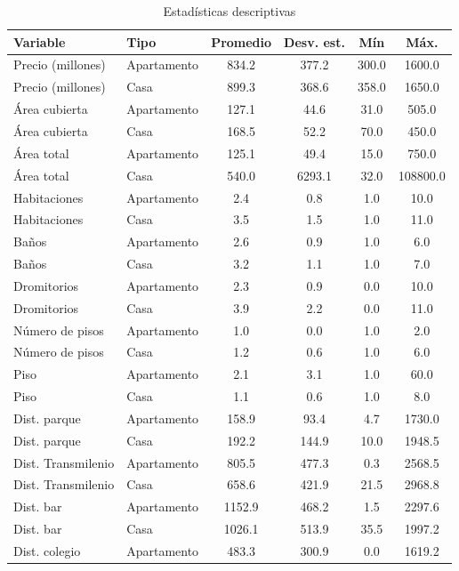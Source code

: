 \documentclass[
  11pt,
  letterpaper,
]{article}
\begin{document}
\begin{table}[!h]
\centering
\caption{\label{tab:descriptive-tbl}Estadísticas descriptivas}
\centering
\begin{tabular}[t]{l|l|c|c|c|c}
\hline
Variable & Tipo & Promedio & Desv. est. & Mín & Máx.\\
\hline
Precio (millones) & Apartamento & 834.2 & 377.2 & 300.0 & 1600.0\\
\hline
Precio (millones) & Casa & 899.3 & 368.6 & 358.0 & 1650.0\\
\hline
Área cubierta & Apartamento & 127.1 & 44.6 & 31.0 & 505.0\\
\hline
Área cubierta & Casa & 168.5 & 52.2 & 70.0 & 450.0\\
\hline
Área total & Apartamento & 125.1 & 49.4 & 15.0 & 750.0\\
\hline
Área total & Casa & 540.0 & 6293.1 & 32.0 & 108800.0\\
\hline
Habitaciones & Apartamento & 2.4 & 0.8 & 1.0 & 10.0\\
\hline
Habitaciones & Casa & 3.5 & 1.5 & 1.0 & 11.0\\
\hline
Baños & Apartamento & 2.6 & 0.9 & 1.0 & 6.0\\
\hline
Baños & Casa & 3.2 & 1.1 & 1.0 & 7.0\\
\hline
Dromitorios & Apartamento & 2.3 & 0.9 & 0.0 & 10.0\\
\hline
Dromitorios & Casa & 3.9 & 2.2 & 0.0 & 11.0\\
\hline
Número de pisos & Apartamento & 1.0 & 0.0 & 1.0 & 2.0\\
\hline
Número de pisos & Casa & 1.2 & 0.6 & 1.0 & 6.0\\
\hline
Piso & Apartamento & 2.1 & 3.1 & 1.0 & 60.0\\
\hline
Piso & Casa & 1.1 & 0.6 & 1.0 & 8.0\\
\hline
Dist. parque & Apartamento & 158.9 & 93.4 & 4.7 & 1730.0\\
\hline
Dist. parque & Casa & 192.2 & 144.9 & 10.0 & 1948.5\\
\hline
Dist. Transmilenio & Apartamento & 805.5 & 477.3 & 0.3 & 2568.5\\
\hline
Dist. Transmilenio & Casa & 658.6 & 421.9 & 21.5 & 2968.8\\
\hline
Dist. bar & Apartamento & 1152.9 & 468.2 & 1.5 & 2297.6\\
\hline
Dist. bar & Casa & 1026.1 & 513.9 & 35.5 & 1997.2\\
\hline
Dist. colegio & Apartamento & 483.3 & 300.9 & 0.0 & 1619.2\\

\end{tabular}
\end{table}
\end{document}
